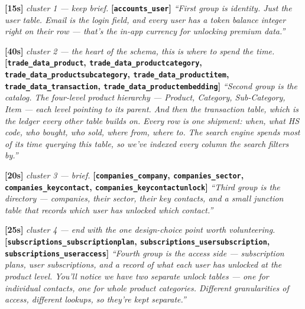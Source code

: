 \documentclass[11pt,a4paper]{article}
\newcommand{\beat}[1]{\textcolor{accent}{\textbf{[#1]}}}
\newcommand{\stage}[1]{{\itshape\color{stageborder}#1}}
\begin{document}
\vspace{0.4em}

\beat{15s} \stage{cluster 1 --- keep brief.} \textbf{[\texttt{accounts\_user}]}
\textit{``First group is identity. Just the user table. Email is the login field, and every user has a token balance integer right on their row --- that's the in-app currency for unlocking premium data.''}

\vspace{0.4em}

\beat{40s} \stage{cluster 2 --- the heart of the schema, this is where to spend the time.} \textbf{[\texttt{trade\_data\_product}, \texttt{trade\_data\_productcategory}, \texttt{trade\_data\_productsubcategory}, \texttt{trade\_data\_productitem}, \texttt{trade\_data\_transaction}, \texttt{trade\_data\_productembedding}]}
\textit{``Second group is the catalog. The four-level product hierarchy --- Product, Category, Sub-Category, Item --- each level pointing to its parent. And then the transaction table, which is the ledger every other table builds on. Every row is one shipment: when, what HS code, who bought, who sold, where from, where to. The search engine spends most of its time querying this table, so we've indexed every column the search filters by.''}

\vspace{0.4em}

\beat{20s} \stage{cluster 3 --- brief.} \textbf{[\texttt{companies\_company}, \texttt{companies\_sector}, \texttt{companies\_keycontact}, \texttt{companies\_keycontactunlock}]}
\textit{``Third group is the directory --- companies, their sector, their key contacts, and a small junction table that records which user has unlocked which contact.''}

\vspace{0.4em}

\beat{25s} \stage{cluster 4 --- end with the one design-choice point worth volunteering.} \textbf{[\texttt{subscriptions\_subscriptionplan}, \texttt{subscriptions\_usersubscription}, \texttt{subscriptions\_useraccess}]}
\textit{``Fourth group is the access side --- subscription plans, user subscriptions, and a record of what each user has unlocked at the product level. You'll notice we have two separate unlock tables --- one for individual contacts, one for whole product categories. Different granularities of access, different lookups, so they're kept separate.''}

\vspace{0.4em}
\end{document}
